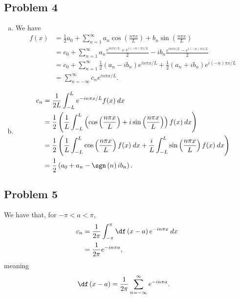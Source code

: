 \documentclass[10pt]{mypackage}
\begin{document}
\subsection{Problem 4}%
\begin{enumerate}[(a)]
  \item We have
    \begin{align*}
      f\left(x\right) &= \frac{1}{2}a_0 + \sum_{n=1}^{\infty}a_n\cos\left(\frac{n\pi x}{L}\right) + b_n \sin\left(\frac{n\pi x}{L}\right)\\
                      &= c_0 + \sum_{n=1}^{\infty}a_n \frac{e^{in\pi x/L} + e^{i\left(-n\right)\pi x/L}}{2} - ib_n \frac{e^{in\pi x/L} - e^{i\left(-n\right)\pi x/L}}{2}\\
                      &= c_0 + \sum_{n=1}^{\infty}\frac{1}{2}\left(a_n - ib_n\right)e^{i n \pi x/L} + \frac{1}{2}\left(a_n + ib_n\right)e^{i\left(-n\right)\pi x/L}\\
                      &= \sum_{n=-\infty}^{\infty} c_ne^{in\pi x/L}.
    \end{align*}
  \item 
    \begin{align*}
      c_n &= \frac{1}{2L}\int_{-L}^{L} e^{-in\pi x/L}f(x)\:dx\\
          &= \frac{1}{2}\left(\frac{1}{L}\int_{-L}^{L} \left(\cos\left(\frac{n\pi x}{L}\right) + i\sin\left(\frac{n\pi x}{L}\right)\right)f(x)\:dx\right)\\
          &= \frac{1}{2}\left(\frac{1}{L}\int_{-L}^{L} \cos\left(\frac{n\pi x}{L}\right)f(x)\:dx + \frac{i}{L}\int_{-L}^{L} \sin\left(\frac{n\pi x}{L}\right)f(x)\:dx\right)\\
          &= \frac{1}{2}\left(a_0 + a_n - \sgn\left(n\right)ib_n\right).
    \end{align*}
\end{enumerate}
\subsection{Problem 5}%
We have that, for $-\pi < a < \pi$,
\begin{align*}
  c_n &= \frac{1}{2\pi}\int_{-\pi}^{\pi} \df\left(x-a\right)e^{-in\pi x}\:dx\\
      &= \frac{1}{2\pi} e^{-in \pi a},
\end{align*}
meaning
\begin{align*}
  \df\left(x-a\right) &= \frac{1}{2\pi}\sum_{n=-\infty}^{\infty}e^{-in\pi a}.
\end{align*}
\end{document}
